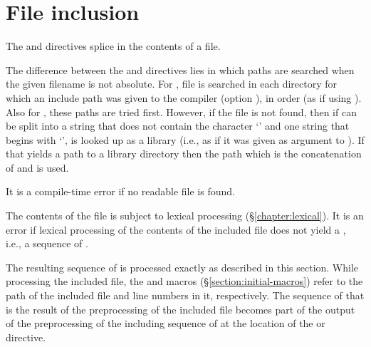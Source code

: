 \section{File inclusion}

\label{section:include}

The  and  directives splice in the contents
of a file.

\begin{rules}
       {\TXT{-}  \TXT{(}  \TXT{)} }

       {\TXT{-}  \TXT{(}  \TXT{)} }

       {}
\end{rules}

The difference between the  and  directives
lies in which paths are searched when the given filename is not
absolute.  For , file  is searched in each
directory for which an include path was given to the compiler (option
), in order (as if using  \cite[p.~230]{otp-dev-ref}).
Also for , these paths are tried first.
However, if the file is not found, then if  can be split into a
string  that does not contain the character `\T{/}' and one
string  that begins with `\T{/}',  is looked up as a
library (i.e., as if it was given as argument to 
\cite[p.~164]{otp-dev-ref}).  If that yields a path  to a
library directory then the path which is the concatenation of
 and  is used.

It is a compile-time error if no readable file is found.

The contents of the file is subject to lexical processing
(\S\ref{chapter:lexical}).  It is an error if lexical processing of
the contents of the included file does not yield a
, i.e., a sequence of .

The resulting sequence of  is processed exactly as
described in this section.  While processing the included file, the
 and  macros (\S\ref{section:initial-macros}) refer to
the path of the included file and line numbers in it, respectively.
The sequence of  that is the result of the
preprocessing of the included file becomes part of the output of the
preprocessing of the including sequence of  at the
location of the  or  directive.

